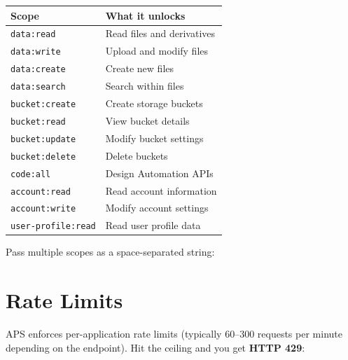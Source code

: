 \documentclass[
  11pt,
  letterpaper,
  DIV=11,
  numbers=noendperiod]{scrreprt}
\newenvironment{Shaded}{\begin{snugshade}}{\end{snugshade}}
\newcommand{\AttributeTok}[1]{\textcolor[rgb]{0.40,0.45,0.13}{#1}}
\newcommand{\FunctionTok}[1]{\textcolor[rgb]{0.28,0.35,0.67}{#1}}
\newcommand{\NormalTok}[1]{\textcolor[rgb]{0.00,0.23,0.31}{#1}}
\newcommand{\OtherTok}[1]{\textcolor[rgb]{0.00,0.23,0.31}{#1}}
\newcommand{\SpecialCharTok}[1]{\textcolor[rgb]{0.37,0.37,0.37}{#1}}
\newcommand{\StringTok}[1]{\textcolor[rgb]{0.13,0.47,0.30}{#1}}
\begin{document}
\begin{longtable}[]{@{}ll@{}}
\toprule\noalign{}
Scope & What it unlocks \\
\midrule\noalign{}
\endhead
\bottomrule\noalign{}
\endlastfoot
\texttt{data:read} & Read files and derivatives \\
\texttt{data:write} & Upload and modify files \\
\texttt{data:create} & Create new files \\
\texttt{data:search} & Search within files \\
\texttt{bucket:create} & Create storage buckets \\
\texttt{bucket:read} & View bucket details \\
\texttt{bucket:update} & Modify bucket settings \\
\texttt{bucket:delete} & Delete buckets \\
\texttt{code:all} & Design Automation APIs \\
\texttt{account:read} & Read account information \\
\texttt{account:write} & Modify account settings \\
\texttt{user-profile:read} & Read user profile data \\
\end{longtable}

Pass multiple scopes as a space-separated string:

\begin{Shaded}
\end{Shaded}

\section{Rate Limits}\label{rate-limits}

APS enforces per-application rate limits (typically 60--300 requests per
minute depending on the endpoint). Hit the ceiling and you get
\textbf{HTTP 429}:
\end{document}
